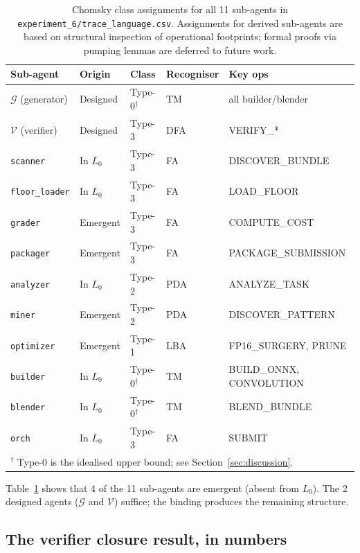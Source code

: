 \begin{table}[ht]
\centering
\caption{Chomsky class assignments for all 11 sub-agents in
\texttt{experiment\_6/trace\_language.csv}.  Assignments for
derived sub-agents are based on structural inspection of
operational footprints; formal proofs via pumping lemmas are
deferred to future work.}
\label{tab:class-signature}
\begin{tabular}{l|l|l|l|l}
\hline
\textbf{Sub-agent} & \textbf{Origin} & \textbf{Class} &
  \textbf{Recogniser} & \textbf{Key ops} \\ \hline
$\mathcal{G}$ (generator) & Designed & Type-0$^\dagger$ & TM &
  all builder/blender \\ \hline
$\mathcal{V}$ (verifier) & Designed & Type-3 & DFA &
  \textsf{VERIFY\_*} \\ \hline
\texttt{scanner}     & In $L_0$ & Type-3 & FA &
  \textsf{DISCOVER\_BUNDLE} \\
\texttt{floor\_loader} & In $L_0$ & Type-3 & FA &
  \textsf{LOAD\_FLOOR} \\
\texttt{grader}      & Emergent & Type-3 & FA &
  \textsf{COMPUTE\_COST} \\
\texttt{packager}    & Emergent & Type-3 & FA &
  \textsf{PACKAGE\_SUBMISSION} \\ \hline
\texttt{analyzer}    & In $L_0$ & Type-2 & PDA &
  \textsf{ANALYZE\_TASK} \\
\texttt{miner}       & Emergent & Type-2 & PDA &
  \textsf{DISCOVER\_PATTERN} \\ \hline
\texttt{optimizer}   & Emergent & Type-1 & LBA &
  \textsf{FP16\_SURGERY}, \textsf{PRUNE} \\ \hline
\texttt{builder}     & In $L_0$ & Type-0$^\dagger$ & TM &
  \textsf{BUILD\_ONNX}, \textsf{CONVOLUTION} \\
\texttt{blender}     & In $L_0$ & Type-0$^\dagger$ & TM &
  \textsf{BLEND\_BUNDLE} \\
\texttt{orch}        & In $L_0$ & Type-3 & FA &
  \textsf{SUBMIT} \\ \hline
\multicolumn{5}{l}{$^\dagger$ Type-0 is the idealised upper bound;
see Section~\ref{sec:discussion}.}
\end{tabular}
\end{table}

Table~\ref{tab:class-signature} shows that 4 of the 11 sub-agents
are emergent (absent from $L_0$).  The 2 designed agents
($\mathcal{G}$ and $\mathcal{V}$) suffice; the binding produces the
remaining structure.

\subsection{The verifier closure result, in numbers}

